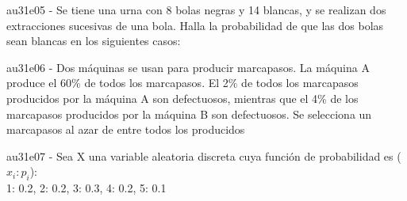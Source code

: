 \documentclass[spanish, 11pt]{exam}
\begin{document}
\begin{questions}
        \begin{multicols}{2}
        \end{multicols}
        \question au31e05 - Se tiene una urna con 8 bolas negras y 14 blancas, y se realizan dos extracciones 
sucesivas de una bola. 
Halla la probabilidad de que las dos bolas sean blancas en los siguientes casos:
        \begin{multicols}{2}
        \end{multicols}
        \question au31e06 - Dos máquinas se usan para producir marcapasos. La máquina A produce el 60\% de todos los marcapasos.
El 2\% de todos los marcapasos producidos por la máquina A son defectuosos, mientras que el 4\% de los
marcapasos producidos por la máquina B son defectuosos. Se selecciona un marcapasos al azar de entre
todos los producidos

        \begin{multicols}{2}
        \end{multicols}
        \question au31e07 - Sea X una variable aleatoria discreta cuya función de probabilidad es ($x_i:p_i$):\\{1: 0.2, 2: 0.2, 3: 0.3, 4: 0.2, 5: 0.1} 
    

\end{questions}
\end{document}
